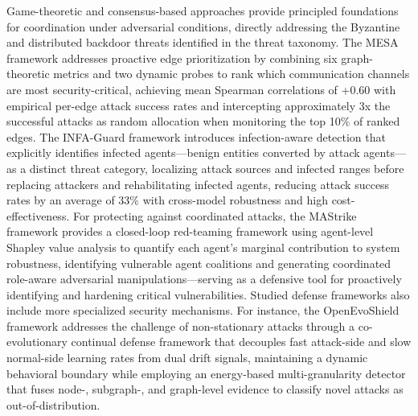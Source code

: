 \documentclass[11pt]{article}
\begin{document}
Game-theoretic and consensus-based approaches provide principled foundations for coordination under adversarial conditions, directly addressing the Byzantine and distributed backdoor threats identified in the threat taxonomy. The MESA framework \cite{ref436} addresses proactive edge prioritization by combining six graph-theoretic metrics and two dynamic probes to rank which communication channels are most security-critical, achieving mean Spearman correlations of +0.60 with empirical per-edge attack success rates and intercepting approximately 3x the successful attacks as random allocation when monitoring the top 10\% of ranked edges. The INFA-Guard framework \cite{ref437} introduces infection-aware detection that explicitly identifies infected agents---benign entities converted by attack agents---as a distinct threat category, localizing attack sources and infected ranges before replacing attackers and rehabilitating infected agents, reducing attack success rates by an average of 33\% with cross-model robustness and high cost-effectiveness. For protecting against coordinated attacks, the MAStrike framework \cite{ref438} provides a closed-loop red-teaming framework using agent-level Shapley value analysis to quantify each agent's marginal contribution to system robustness, identifying vulnerable agent coalitions and generating coordinated role-aware adversarial manipulations---serving as a defensive tool for proactively identifying and hardening critical vulnerabilities. Studied defense frameworks also include more specialized security mechanisms. For instance, the OpenEvoShield framework \cite{ref439} addresses the challenge of non-stationary attacks through a co-evolutionary continual defense framework that decouples fast attack-side and slow normal-side learning rates from dual drift signals, maintaining a dynamic behavioral boundary while employing an energy-based multi-granularity detector that fuses node-, subgraph-, and graph-level evidence to classify novel attacks as out-of-distribution.
\end{document}
